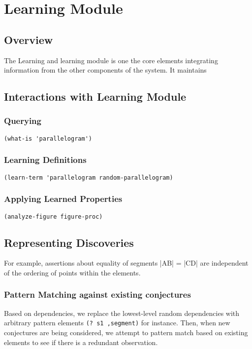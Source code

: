 \chapter{Learning Module}
\label{chap:analyzer}

\section{Overview}

The Learning and learning module is one the core elements integrating
information from the other components of the system. It maintains

\section{Interactions with Learning Module}

\subsection{Querying}

\begin{verbatim}
(what-is 'parallelogram')
\end{verbatim}

\subsection{Learning Definitions}

\begin{verbatim}
(learn-term 'parallelogram random-parallelogram)
\end{verbatim}

\subsection{Applying Learned Properties}

\begin{verbatim}
(analyze-figure figure-proc)
\end{verbatim}

\section{Representing Discoveries}

For example, assertions about equality of segments |AB| = |CD| are
independent of the ordering of points within the elements.

\subsection{Pattern Matching against existing conjectures}

Based on dependencies, we replace the lowest-level random dependencies
with arbitrary pattern elements \texttt{(? s1 ,segment)} for
instance. Then, when new conjectures are being considered, we attempt
to pattern match based on existing elements to see if there is a
redundant observation.
